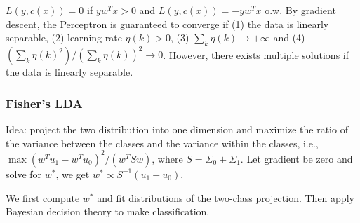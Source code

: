 $L(y, c(x)) = 0$ if $y w^T x >0$ and $L(y, c(x)) = -y w^T x$ o.w. By gradient descent, the Perceptron is guaranteed to converge if (1) the data is linearly separable, (2) learning rate $\eta(k)>0$, (3) $\sum_k \eta(k) \rightarrow +\infty$ and (4) $(\sum_k \eta(k)^2)/(\sum_k \eta(k))^2 \rightarrow 0$. However, there exists multiple solutions if the data is linearly separable.

\subsubsection*{Fisher's LDA}

Idea: project the two distribution into one dimension and maximize the ratio of the variance between the classes and the variance within the classes, i.e., $\max (w^T u_1-w^T u_0)^2/(w^T S w)$, where $S = \Sigma_0+\Sigma_1$. Let gradient be zero and solve for $w^*$, we get $w^*\propto S^{-1}(u_1-u_0)$.

We first compute $w^*$ and fit distributions of the two-class projection. Then apply Bayesian decision theory to make classification.
